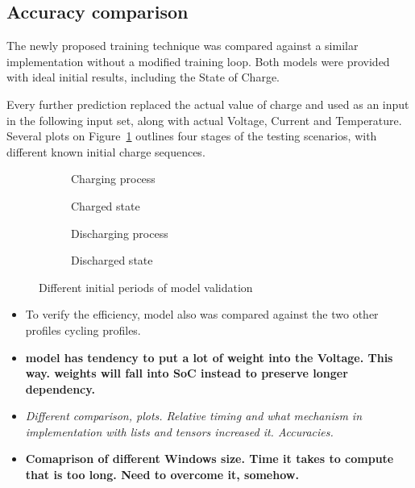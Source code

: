 \subsection{Accuracy comparison}
    The newly proposed training technique was compared against a similar implementation without a modified training loop.
    Both models were provided with ideal initial results, including the State of Charge.
    
    Every further prediction replaced the actual value of charge and used as an input in the following input set, along with actual Voltage, Current and Temperature.
    Several plots on Figure~\ref{fig:init_time} outlines four stages of the testing scenarios, with different known initial charge sequences.
    \begin{figure}[htbp]
        \centering
        \begin{subfigure}[b]{0.475\textwidth}
            \centering
            
            \caption{Charging process}
        \end{subfigure}
        \hfill
        \begin{subfigure}[b]{0.475\textwidth}
            \centering
            
            \caption{Charged state}
        \end{subfigure}
        \hfill
        \begin{subfigure}[b]{0.475\textwidth}
            \centering
            
            \caption{Discharging process}
        \end{subfigure}
        \begin{subfigure}[b]{0.475\textwidth}
            \centering
            
            \caption{Discharged state}
        \end{subfigure}
        \caption{Different initial periods of model validation}
        \label{fig:init_time}
    \end{figure}
    \begin{itemize}
        \item To verify the efficiency, model also was compared against the two other profiles cycling profiles. \\
        \item \textbf{model has tendency to put a lot of weight into the Voltage. This way. weights will fall into SoC instead to preserve longer dependency.} \\
        \item \textit{Different comparison, plots. Relative timing and what mechanism in implementation with lists and tensors increased it. Accuracies.} \\
        \item \textbf{Comaprison of different Windows size. Time it takes to compute that is too long. Need to overcome it, somehow.} \\
    \end{itemize}
